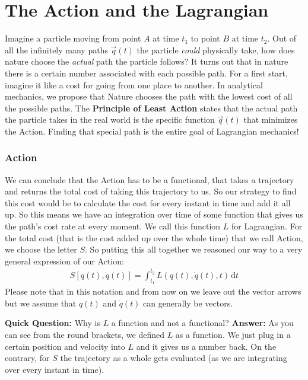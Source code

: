 \section{The Action and the Lagrangian}
Imagine a particle moving from point $A$ at time $t_1$ to point $B$ at time $t_2$. Out of all the infinitely many paths $\vec{q}(t)$ the particle \textit{could} physically take, how does nature choose the \textit{actual} path the particle follows?
It turns out that in nature there is a certain number associated with each possible path. For a first start, imagine it like a cost for going from one place to another. In analytical mechanics, we propose that Nature chooses the path with the lowest cost of all the possible paths.
The \textbf{Principle of Least Action} states that the actual path the particle takes in the real world is the specific function $\vec{q}(t)$ that minimizes the Action. Finding that special path is the entire goal of Lagrangian mechanics!
\subsubsection*{Action}
We can conclude that the Action has to be a functional, that takes a trajectory and returns the total cost of taking this trajectory to us.
So our strategy to find this cost would be to calculate the cost for every instant in time and add it all up. So this means we have an integration over time of some function that gives us the path's cost rate at every moment. We call this function $L$ for Lagrangian. For the total cost (that is the cost added up over the whole time) that we call Action, we choose the letter $S$. So putting this all together we reasoned our way to a very general expression of our Action: 
\begin{align} \label{eq:action}
        S[q(t), \dot{q}(t)]=\int_{t_1}^{t_2} L(q(t), \dot{q}(t), t)\,\text{d}t
\end{align}
Please note that in this notation and from now on we leave out the vector arrows but we assume that $q(t)$ and $\dot{q}(t)$ can generally be vectors.

\textbf{Quick Question:} Why is $L$ a function and not a functional? \textbf{Answer:} As you can see from the round brackets, we defined $L$ as a function. We just plug in a certain position and velocity into $L$ and it gives us a number back. On the contrary, for $S$ the trajectory as a whole gets evaluated (as we are integrating over every instant in time).
